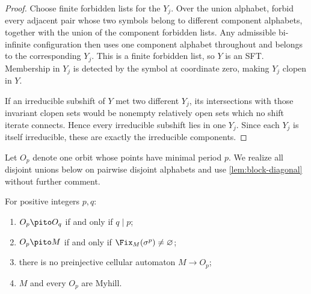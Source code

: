 \begin{proof}
Choose finite forbidden lists for the $Y_j$.  Over the union alphabet, forbid
every adjacent pair whose two symbols belong to different component
alphabets, together with the union of the component forbidden lists.  Any
admissible bi-infinite configuration then uses one component alphabet
throughout and belongs to the corresponding $Y_j$.  This is a finite
forbidden list, so $Y$ is an SFT.  Membership in $Y_j$ is detected by the
symbol at coordinate zero, making $Y_j$ clopen in $Y$.

If an irreducible subshift of $Y$ met two different $Y_j$, its intersections
with those invariant clopen sets would be nonempty relatively open sets which
no shift iterate connects.  Hence every irreducible subshift lies in one
$Y_j$.  Since each $Y_j$ is itself irreducible, these are exactly the
irreducible components.
\end{proof}

Let $O_p$ denote one orbit whose points have minimal period $p$.  We realize
all disjoint unions below on pairwise disjoint alphabets and use
\cref{lem:block-diagonal} without further comment.



\begin{lemma}
\label{lem:periodic-routes}
For positive integers $p,q$:
\begin{enumerate}[label=(\roman*)]
  \item $O_p\pito O_q$ if and only if $q\mid p$;
  \item $O_p\pito M$ if and only if
  $\Fix_M(\sigma^p)\ne\varnothing$;
  \item there is no preinjective cellular automaton $M\to O_p$;
  \item $M$ and every $O_p$ are Myhill.
\end{enumerate}
\end{lemma}

